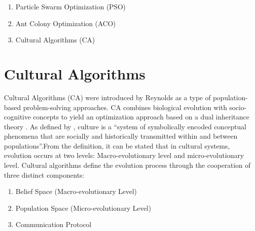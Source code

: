 \begin{enumerate}
	\item Particle Swarm Optimization (PSO)
	\item Ant Colony Optimization (ACO)
	\item Cultural Algorithms (CA)
\end{enumerate}
\section{Cultural Algorithms}
Cultural Algorithms (CA) were introduced by Reynolds as a type of population-based problem-solving approaches. CA combines biological evolution with socio-cognitive concepts to yield an optimization approach based on a dual inheritance theory \cite{reynolds1994introduction}. As defined by \cite{durham1991coevolution}, culture is a \enquote{system of symbolically encoded conceptual phenomena that are socially and historically transmitted within and between populations}.From the definition, it can be stated that in cultural systems, evolution occurs at two levels: Macro-evolutionary level and micro-evolutionary level. Cultural algorithms define the evolution process through the cooperation of three distinct components: 
\begin{enumerate}
	\item Belief Space (Macro-evolutionary Level)
	\item Population Space (Micro-evolutionary Level)
	\item Communication Protocol
\end{enumerate}
